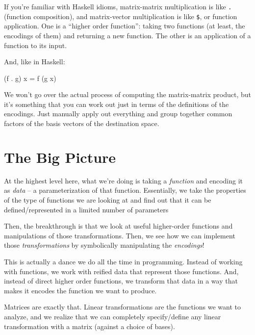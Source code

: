 \documentclass[]{article}
\newenvironment{Shaded}{}{}
\newcommand{\FunctionTok}[1]{\textcolor[rgb]{0.02,0.16,0.49}{#1}}
\newcommand{\NormalTok}[1]{#1}
\begin{document}
If you're familiar with Haskell idioms, matrix-matrix multiplication is like
\texttt{.} (function composition), and matrix-vector multiplication is like
\texttt{\$}, or function application. One is a ``higher order function'': taking
two functions (at least, the encodings of them) and returning a new function.
The other is an application of a function to its input.

And, like in Haskell:

\begin{Shaded}
\begin{Highlighting}[]
\NormalTok{(f }\FunctionTok{.}\NormalTok{ g) x }\FunctionTok{=}\NormalTok{ f (g x)}
\end{Highlighting}
\end{Shaded}

We won't go over the actual process of computing the matrix-matrix product, but
it's something that you can work out just in terms of the definitions of the
encodings. Just manually apply out everything and group together common factors
of the basis vectors of the destination space.

\hypertarget{the-big-picture}{%
\section{The Big Picture}\label{the-big-picture}}

At the highest level here, what we're doing is taking a \emph{function} and
encoding it as \emph{data} -- a parameterization of that function. Essentially,
we take the properties of the type of functions we are looking at and find out
that it can be defined/represented in a limited number of parameters

Then, the breakthrough is that we look at useful higher-order functions and
manipulations of those transformations. Then, we see how we can implement those
\emph{transformations} by symbolically manipulating the \emph{encodings}!

This is actually a dance we do all the time in programming. Instead of working
with functions, we work with reified data that represent those functions. And,
instead of direct higher order functions, we transform that data in a way that
makes it encodes the function we want to produce.

Matrices are exactly that. Linear transformations are the functions we want to
analyze, and we realize that we can completely specify/define any linear
transformation with a matrix (against a choice of bases).
\end{document}

